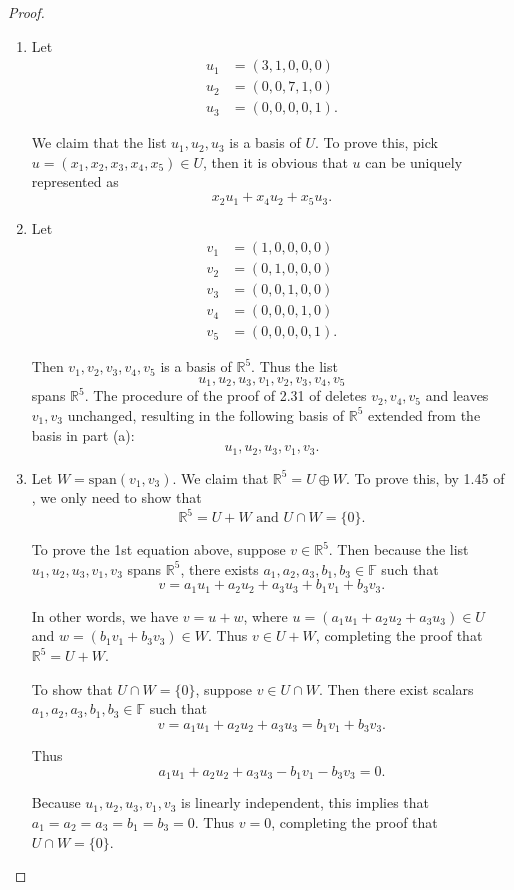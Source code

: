 \begin{proof}
\begin{enumerate}[label=(\alph*)]
\item Let
\begin{equation*}
\begin{split}
u_1&=(3,1,0,0,0)\\
u_2&=(0,0,7,1,0)\\
u_3&=(0,0,0,0,1).
\end{split}
\end{equation*}

We claim that the list $u_1,u_2,u_3$ is a basis of $U$. To prove this, pick $u=(x_1,x_2,x_3,x_4,x_5)\in U$, then it is obvious that $u$ can be uniquely represented as\[
x_2u_1+x_4u_2+x_5u_3.
\]
\item Let
\begin{equation*}
\begin{split}
v_1&=(1,0,0,0,0)\\
v_2&=(0,1,0,0,0)\\
v_3&=(0,0,1,0,0)\\
v_4&=(0,0,0,1,0)\\
v_5&=(0,0,0,0,1).
\end{split}
\end{equation*}

Then $v_1,v_2,v_3,v_4,v_5$ is a basis of $\mathbb{R}^5$. Thus the list\[
u_1,u_2,u_3,v_1,v_2,v_3,v_4,v_5
\] spans $\mathbb{R}^5$. The procedure of the proof of 2.31 of \cite{axler2014linear} deletes $v_2,v_4,v_5$ and leaves $v_1,v_3$ unchanged, resulting in the following basis of $\mathbb{R}^5$ extended from the basis in part (a):
\[
u_1,u_2,u_3,v_1,v_3.
\]
\item Let $W=\text{span}(v_1,v_3)$. We claim that $\mathbb{R}^5=U\oplus W$. To prove this, by 1.45 of \cite{axler2014linear}, we only need to show that\[
\mathbb{R}^5=U+W\text{ and }U\cap W=\{0\}.
\]

To prove the 1st equation above, suppose $v\in \mathbb{R}^5$. Then because the list $u_1,u_2,u_3,v_1,v_3$ spans $\mathbb{R}^5$, there exists $a_1,a_2,a_3,b_1,b_3\in\mathbb{F}$ such that\[
v=a_1u_1+a_2u_2+a_3u_3+b_1v_1+b_3v_3.
\]

In other words, we have $v=u+w$, where $u=(a_1u_1+a_2u_2+a_3u_3)\in U$ and $w=(b_1v_1+b_3v_3)\in W$. Thus $v\in U+W$, completing the proof that $\mathbb{R}^5=U+W$.

To show that $U\cap W=\{0\}$, suppose $v\in U\cap W$. Then there exist scalars $a_1,a_2,a_3,b_1,b_3\in\mathbb{F}$ such that\[
v= a_1u_1+a_2u_2+a_3u_3=b_1v_1+b_3v_3.
\]

Thus\[
a_1u_1+a_2u_2+a_3u_3-b_1v_1-b_3v_3=0.
\]

Because $u_1,u_2,u_3,v_1,v_3$ is linearly independent, this implies that $a_1=a_2=a_3=b_1=b_3=0$. Thus $v=0$, completing the proof that $U\cap W=\{0\}$.
\end{enumerate}
\end{proof}

